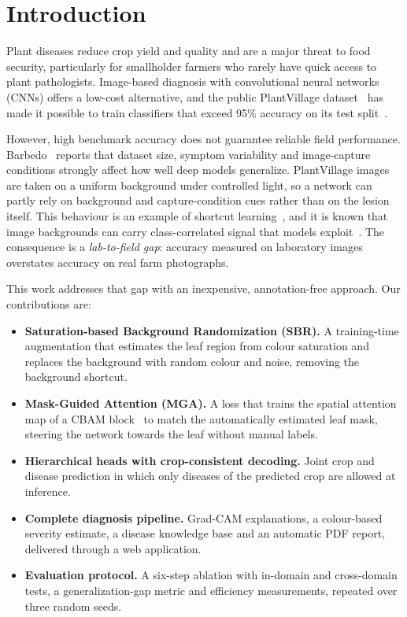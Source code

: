 \documentclass[conference]{IEEEtran}
\begin{document}
\section{Introduction}
Plant diseases reduce crop yield and quality and are a major threat to food security, particularly for smallholder farmers who rarely have quick access to plant pathologists. Image-based diagnosis with convolutional neural networks (CNNs) offers a low-cost alternative, and the public PlantVillage dataset~\cite{hughes2015} has made it possible to train classifiers that exceed 95\% accuracy on its test split~\cite{mohanty2016,ferentinos2018}.

However, high benchmark accuracy does not guarantee reliable field performance. Barbedo~\cite{barbedo2018} reports that dataset size, symptom variability and image-capture conditions strongly affect how well deep models generalize. PlantVillage images are taken on a uniform background under controlled light, so a network can partly rely on background and capture-condition cues rather than on the lesion itself. This behaviour is an example of shortcut learning~\cite{geirhos2020}, and it is known that image backgrounds can carry class-correlated signal that models exploit~\cite{xiao2021}. The consequence is a \emph{lab-to-field gap}: accuracy measured on laboratory images overstates accuracy on real farm photographs.

This work addresses that gap with an inexpensive, annotation-free approach. Our contributions are:
\begin{itemize}
\item \textbf{Saturation-based Background Randomization (SBR).} A training-time augmentation that estimates the leaf region from colour saturation and replaces the background with random colour and noise, removing the background shortcut.
\item \textbf{Mask-Guided Attention (MGA).} A loss that trains the spatial attention map of a CBAM block~\cite{woo2018} to match the automatically estimated leaf mask, steering the network towards the leaf without manual labels.
\item \textbf{Hierarchical heads with crop-consistent decoding.} Joint crop and disease prediction in which only diseases of the predicted crop are allowed at inference.
\item \textbf{Complete diagnosis pipeline.} Grad-CAM explanations, a colour-based severity estimate, a disease knowledge base and an automatic PDF report, delivered through a web application.
\item \textbf{Evaluation protocol.} A six-step ablation with in-domain and cross-domain tests, a generalization-gap metric and efficiency measurements, repeated over three random seeds.
\end{itemize}
\end{document}
